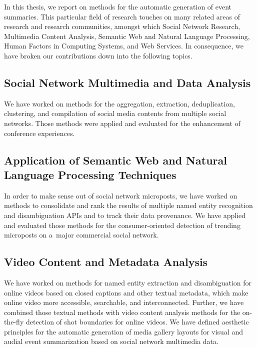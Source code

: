 In this thesis, we report on methods for
the automatic generation of event summaries.
This particular field of research touches on many related areas
of research and research communities,
amongst which Social Network Research, Multimedia Content Analysis,
Semantic Web and Natural Language Processing,
Human Factors in Computing Systems,
and Web Services.
In consequence, we have broken our contributions down into
the following topics.

\subsection{Social Network Multimedia and Data Analysis}

We have worked on methods for the aggregation, extraction,
deduplication, clustering, and compilation
of social media contents from
multiple social networks.
Those methods were applied and evaluated
for the enhancement of conference experiences.

\subsection{Application of Semantic Web and Natural Language Processing Techniques}

In order to make sense out of social network microposts,
we have worked on methods to consolidate and rank
the results of multiple named entity recognition and
disambiguation APIs and to track their data provenance.
We have applied and evaluated those methods
for the consumer-oriented detection of trending microposts
on a~major commercial social network.

\subsection{Video Content and Metadata Analysis}

We have worked on methods for named entity extraction and
disambiguation for online videos based on closed captions
and other textual metadata, which make online video
more accessible, searchable, and interconnected.
Further, we have combined those textual methods with 
video content analysis methods for the on-the-fly detection
of shot boundaries for online videos.
We have defined aesthetic principles
for the automatic generation of media gallery layouts
for visual and audial event summarization
based on social network multimedia data.
        
